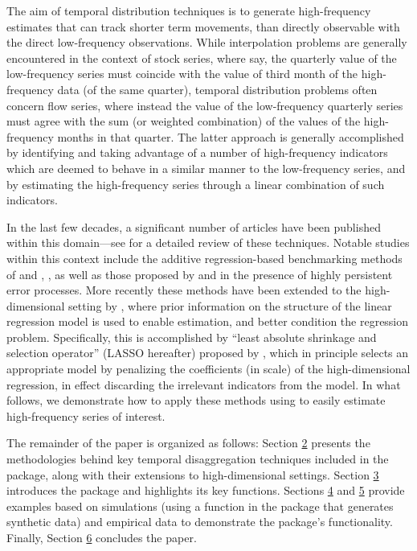 The aim of temporal distribution techniques is to generate high-frequency estimates that can track shorter term movements, than directly observable with the direct low-frequency observations. While interpolation problems are generally encountered in the context of stock series, where say, the quarterly value of the low-frequency series must coincide with the value of third month of the high-frequency data (of the same quarter), temporal distribution problems often concern flow series, where instead the value of the low-frequency quarterly series must agree with the sum (or weighted combination) of the values of the high-frequency months in that quarter. The latter approach is generally accomplished by identifying and taking advantage of a number of high-frequency indicators which are deemed to behave in a similar manner to the low-frequency series, and by estimating the high-frequency series through a linear combination of such indicators.

In the last few decades, a significant number of articles have been published within this domain---see \citet{dagum2006benchmarking} for a detailed review of these techniques. Notable studies within this context include the additive regression-based benchmarking methods of \citet{denton1971adjustment} and \citet{chow1971best}, \citet{chow1976best}, as well as those proposed by \citet{fernandez1981methodological} and \citet{litterman1983random} in the presence of highly persistent error processes. More recently these methods have been extended to the high-dimensional setting by \citet{10-1111rssa-12952}, where prior information on the structure of the linear regression model is used to enable estimation, and better condition the regression problem. Specifically, this is accomplished by \textquotedblleft{}least absolute shrinkage and selection operator\textquotedblright{} (LASSO hereafter) proposed by \citet{tibshirani1996regression}, which in principle selects an appropriate model by penalizing the coefficients (in scale) of the high-dimensional regression, in effect discarding the irrelevant indicators from the model. In what follows, we demonstrate how to apply these methods using  to easily estimate high-frequency series of interest.

The remainder of the paper is organized as follows: Section \protect\hyperlink{Sparse-temporal-disaggregation}{2} presents the methodologies behind key temporal disaggregation techniques included in the  package, along with their extensions to high-dimensional settings. Section \protect\hyperlink{The-package}{3} introduces the  package and highlights its key functions. Sections \protect\hyperlink{Simulations}{4} and \protect\hyperlink{Empirical-application}{5} provide examples based on simulations (using a function in the package that generates synthetic data) and empirical data to demonstrate the package's functionality. Finally, Section \protect\hyperlink{Summary}{6} concludes the paper.

